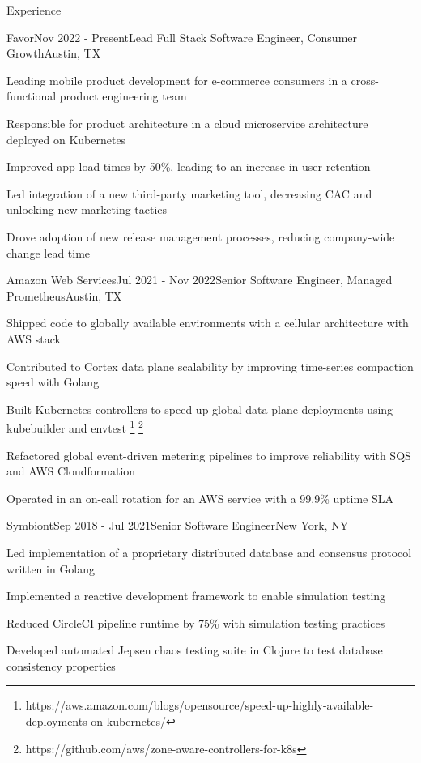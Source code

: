 \documentclass[
	11pt, %
]{resume} %
\begin{document}
\begin{rSection}{Experience}

	\begin{rSubsection}{Favor}{Nov 2022 - Present}{Lead Full Stack Software Engineer, Consumer Growth}{Austin, TX}
        \item Leading mobile product development for e-commerce consumers in a cross-functional product engineering team
        \item Responsible for product architecture in a cloud microservice architecture deployed on Kubernetes
        \item Improved app load times by 50\%, leading to an increase in user retention
        \item Led integration of a new third-party marketing tool, decreasing CAC and unlocking new marketing tactics
        \item Drove adoption of new release management processes, reducing company-wide change lead time
	\end{rSubsection}


    \begin{rSubsection}{Amazon Web Services}{Jul 2021 - Nov 2022}{Senior Software Engineer, Managed Prometheus}{Austin, TX}
        \item Shipped code to globally available environments with a cellular architecture with AWS stack
        \item Contributed to Cortex data plane scalability by improving time-series compaction speed with Golang
        \item Built Kubernetes controllers to speed up global data plane deployments using kubebuilder and envtest \footnote{https://aws.amazon.com/blogs/opensource/speed-up-highly-available-deployments-on-kubernetes/} \footnote{https://github.com/aws/zone-aware-controllers-for-k8s}
        \item Refactored global event-driven metering pipelines to improve reliability with SQS and AWS Cloudformation
        \item Operated in an on-call rotation for an AWS service with a 99.9\% uptime SLA
    \end{rSubsection}

    \begin{rSubsection}{Symbiont}{Sep 2018 - Jul 2021}{Senior Software Engineer}{New York, NY}
        \item Led implementation of a proprietary distributed database and consensus protocol written in Golang
        \item Implemented a reactive development framework to enable simulation testing
        \item Reduced CircleCI pipeline runtime by 75\% with simulation testing practices
        \item Developed automated Jepsen chaos testing suite in Clojure to test database consistency properties
    \end{rSubsection}


\end{rSection}
\end{document}
